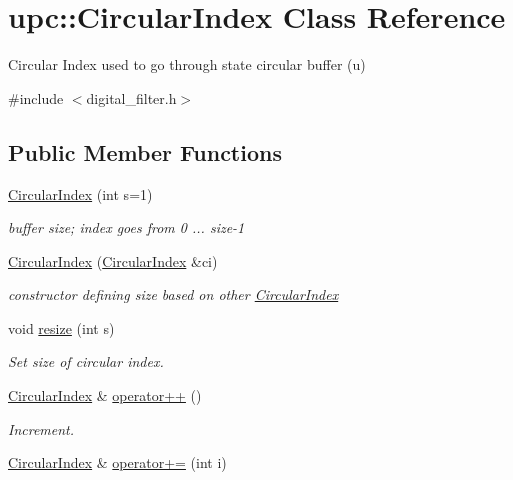 \hypertarget{classupc_1_1CircularIndex}{}\section{upc\+:\+:Circular\+Index Class Reference}
\label{classupc_1_1CircularIndex}


Circular Index used to go through state circular buffer (u)  




{\ttfamily \#include $<$digital\+\_\+filter.\+h$>$}

\subsection*{Public Member Functions}
\begin{DoxyCompactItemize}
\item 
\hyperlink{classupc_1_1CircularIndex_a80c03ec94380d80132ca01b39ef9b0e7}{Circular\+Index} (int s=1)
\begin{DoxyCompactList}\small\item\em buffer size; index goes from 0 ... size-\/1 \end{DoxyCompactList}\item 
\hyperlink{classupc_1_1CircularIndex_abca2976e157594a74d4aa1c06b0c4c2e}{Circular\+Index} (\hyperlink{classupc_1_1CircularIndex}{Circular\+Index} \&ci)
\begin{DoxyCompactList}\small\item\em constructor defining size based on other \hyperlink{classupc_1_1CircularIndex}{Circular\+Index} \end{DoxyCompactList}\item 
void \hyperlink{classupc_1_1CircularIndex_aa8bfc28723ab87c1ab66262843aac2a5}{resize} (int s)
\begin{DoxyCompactList}\small\item\em Set size of circular index. \end{DoxyCompactList}\item 
\hyperlink{classupc_1_1CircularIndex}{Circular\+Index} \& \hyperlink{classupc_1_1CircularIndex_a8c02bb1020495ad418f1c0770a03a9f6}{operator++} ()
\begin{DoxyCompactList}\small\item\em Increment. \end{DoxyCompactList}\item 
\hyperlink{classupc_1_1CircularIndex}{Circular\+Index} \& \hyperlink{classupc_1_1CircularIndex_a687ae675e4a3f8a95fc69eb0b961c0a5}{operator+=} (int i)

\end{DoxyCompactItemize}
